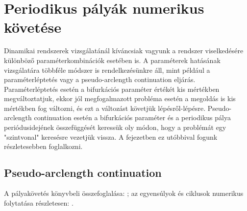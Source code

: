
\chapter{\label{sec:perpalyakovetes}Periodikus pályák numerikus követése}

Dinamikai rendszerek vizsgálatánál kíváncsiak vagyunk a rendszer viselkedésére különböző paraméterkombinációk esetében is.
A paraméterek ha\-tá\-sá\-nak vizsgálatára többféle módszer is rendelkezésünkre áll, mint például a paraméterléptetés vagy a pseudo-arclength continuation eljárás.
Paraméterléptetés esetén a bifurkációs paraméter értékét kis mértékben megváltoztatjuk, ekkor jól megfogalmazott probléma esetén a megoldás is kis mértékben fog változni, és ezt a változást követjük lépésről-lépésre.
Pseudo-arclength continuation esetén a bifurkációs paraméter és a periodikus pálya periódusidejének össze\-füg\-gé\-sét keressük oly módon, hogy a problémát egy "szintvonal" keresésre vezetjük vissza.
A fejezetben ez utóbbival fogunk részletesebben foglalkozni. 

\section{Pseudo-arclength continuation}
A pályakövetés könyvbeli összefoglalása: \cite[2.6.2. szakasz]{dib}; az egyensúlyok és ciklusok numerikus folytatása részletesen: \cite[10.1.4. és 10.2.1. szakasz]{kuznetsov_book}.

\label{sec:pseudo_ivhossz}

